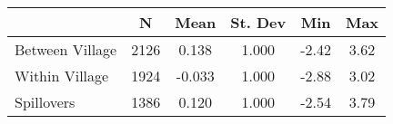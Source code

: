 \begin{tabular}{l*{5}{c}}\hline&\multicolumn{1}{c}{N}&\multicolumn{1}{c}{Mean}&\multicolumn{1}{c}{St. Dev}&\multicolumn{1}{c}{Min}&\multicolumn{1}{c}{Max}\\ \hline 
Between Village & 2126 & 0.138 & 1.000 & -2.42 & 3.62 \\
Within Village & 1924 & -0.033 & 1.000 & -2.88 & 3.02 \\
Spillovers & 1386 & 0.120 & 1.000 & -2.54 & 3.79 \\
\hline \end{tabular}
